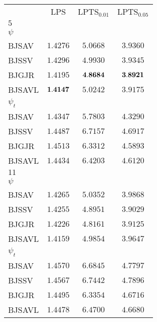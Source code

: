 \documentclass[12pt]{article}
\theoremstyle{plain}
\numberwithin{equation}{section}
\begin{document}
\begin{table}[h!]
\begin{center}
\begin{small}\begin{tabular}{ l c c c }
\hline\hline
{}&{LPS}&{LPTS$_{0.01}$}&{LPTS$_{0.05}$}\\
{$5$} &{}&{}&{}\\
{$\psi$} \\
 {BJSAV}&    $1.4276$              &     $5.0668$             &     $3.9360$       \\
{BJSSV}&     $1.4296$              &     $4.9930$             &     $3.9345$       \\
{BJGJR}&     $1.4195$              &     ${\bf{4.8684}}$             &     ${\bf{3.8921}}$        \\
{BJSAVL}&   ${\bf{1.4147}}$              &     $5.0242$             &     $3.9175$        \\
{$\psi_t$} \\
 {BJSAV}&     $1.4347$             &     $5.7803$             &     $4.3290$      \\
{BJSSV}&     $1.4487$              &     $6.7157$             &     $4.6917$      \\
{BJGJR}&     $1.4513$              &     $ 6.3312$            &     $4.5893$      \\
{BJSAVL}&   $1.4434$              &     $6.4203$             &     $4.6120$      \\\hline
{$11$} &{}&{}&{}\\
{$\psi$} \\
 {BJSAV}&    $1.4265$               &     $5.0352$             &     $3.9868$      \\
{BJSSV}&     $1.4255$              &     $4.8951$             &     $3.9029$      \\
{BJGJR}&     $1.4226$              &     $4.8161$             &     $3.9125$      \\
{BJSAVL}&   $1.4159$              &     $4.9854$             &     $3.9647$      \\
{$\psi_t$} \\
 {BJSAV}&     $1.4570$             &     $6.6845$             &     $4.7797$      \\
{BJSSV}&     $1.4567$              &    $6.7442$             &     $4.7896$      \\
{BJGJR}&     $1.4495$              &    $6.3354$             &     $4.6716$      \\
{BJSAVL}&   $1.4478$              &     $6.4700$             &     $4.6680$      \\\hline

\end{tabular}
\end{small}
\end{center}
\end{table}
\end{document}
